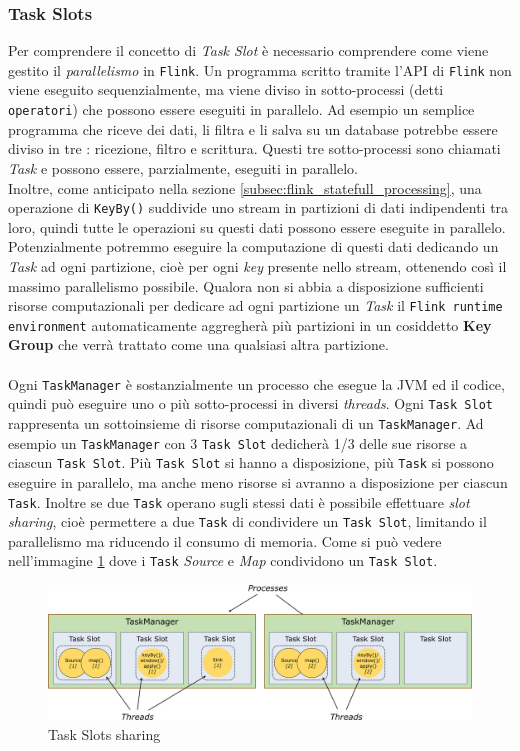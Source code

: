 \subsubsection{Task Slots}
\label{subsubsec:flink_Task_slots}
Per comprendere il concetto di \textit{Task Slot} è necessario comprendere come viene gestito il \textit{parallelismo} in \texttt{Flink}.    
Un programma scritto tramite l'API di \texttt{Flink} non viene eseguito sequenzialmente, ma viene diviso in sotto-processi (detti \texttt{operatori}) che possono essere eseguiti in parallelo.
Ad esempio un semplice programma che riceve dei dati, li filtra e li salva su un database potrebbe essere diviso in tre : ricezione, filtro e scrittura.
Questi tre sotto-processi sono chiamati \textit{Task} e possono essere, parzialmente, eseguiti in parallelo.\\
Inoltre, come anticipato nella sezione \ref{subsec:flink_statefull_processing}, una operazione di \texttt{KeyBy()} suddivide uno stream in partizioni di dati
indipendenti tra loro, quindi tutte le operazioni su questi dati possono essere eseguite in parallelo.
Potenzialmente potremmo eseguire la computazione di questi dati dedicando un \textit{Task} ad ogni partizione, cioè per ogni \textit{key} presente nello stream,
ottenendo così il massimo parallelismo possibile.
Qualora non si abbia a disposizione sufficienti risorse computazionali per dedicare ad ogni partizione un \textit{Task} il \texttt{Flink runtime environment} 
automaticamente aggregherà più partizioni in un cosiddetto \textbf{Key Group} che verrà trattato come una qualsiasi altra partizione.
\\\\
Ogni \texttt{TaskManager} è sostanzialmente un processo che esegue la JVM ed il codice, quindi può eseguire uno o più sotto-processi in diversi \textit{threads}.
Ogni \texttt{Task Slot} rappresenta un sottoinsieme di risorse computazionali di un \texttt{TaskManager}.
Ad esempio un \texttt{TaskManager} con 3 \texttt{Task Slot} dedicherà 1/3 delle sue risorse a ciascun \texttt{Task Slot}.
Più \texttt{Task Slot} si hanno a disposizione, più \texttt{Task} si possono eseguire in parallelo, ma anche meno risorse si avranno a disposizione per ciascun \texttt{Task}.
Inoltre se due \texttt{Task} operano sugli stessi dati è possibile effettuare \textit{slot sharing}, cioè permettere a due \texttt{Task} di condividere un \texttt{Task Slot}, limitando il parallelismo ma riducendo il consumo di memoria.
Come si può vedere nell'immagine \ref{fig:flink_slots} dove i \texttt{Task} \textit{Source} e \textit{Map} condividono un \texttt{Task Slot}.
\begin{figure}[htbp]
    \centering
    \includegraphics[width=\textwidth]{images/flink/Tasks_slots.jpg}
    \caption{Task Slots sharing}
    \label{fig:flink_slots}
\end{figure}


